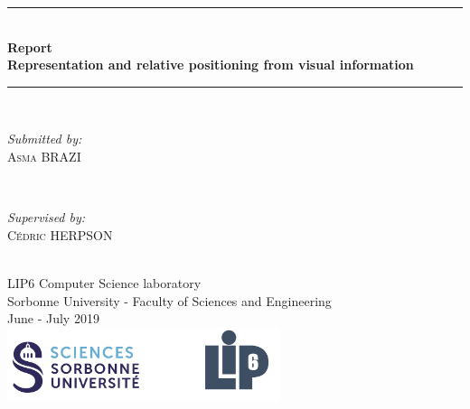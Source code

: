 \documentclass[12pt]{report}
\begin{document}
	\begin{titlepage}
		
		\newcommand{\HRule}{\rule{\linewidth}{0.5mm}} %
		
		\center 
		\HRule \\[0.4cm]
		{ \huge \bfseries Report \\Representation and relative positioning from visual information}\\[0.4cm]
		\HRule \\[1.5cm]
		
		\begin{minipage}{0.4\textwidth}
			\begin{flushleft} \large
				\emph{Submitted by:}\\
				\textsc{Asma BRAZI}
			\end{flushleft}
		\end{minipage}
		~
		\begin{minipage}{0.4\textwidth}
			\begin{flushright} \large
				\emph{Supervised by:} \\
				\textsc{Cédric HERPSON}\\
			\end{flushright}
		\end{minipage}\\[4cm]
		
		
		{LIP6 Computer Science laboratory} \\ {Sorbonne 
University - Faculty of Sciences and Engineering}\\[3cm] 
		{\large June - July 2019 }\\[3cm] 
		\includegraphics[width=0.6\textwidth]{res/logo.png}\\[1cm] 
		\vfill %
		
	\end{titlepage}
	
\end{document}
